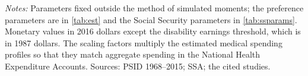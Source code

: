 \begin{table}[!htbp]
\centering
\caption{Calibrated Parameters}
\label{tab:calibrated}
\vspace{6pt}
\footnotesize
\begin{threeparttable}

\begin{tablenotes}[flushleft]\scriptsize
\item[] \textit{Notes:} Parameters fixed outside the method of simulated moments; the preference parameters are in \autoref{tab:est} and the Social Security parameters in \autoref{tab:ssparams}. Monetary values in 2016 dollars except the disability earnings threshold, which is in 1987 dollars. The scaling factors multiply the estimated medical spending profiles so that they match aggregate spending in the National Health Expenditure Accounts. Sources: PSID 1968--2015; SSA; the cited studies.
\end{tablenotes}
\end{threeparttable}
\end{table}
